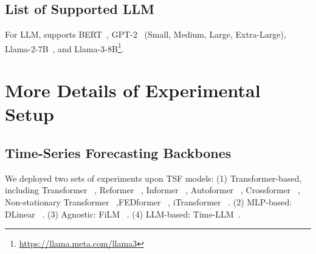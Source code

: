 \subsection{List of Supported LLM}
For LLM, \mmtsf supports BERT~\cite{devlin2018bert}, GPT-2~\cite{radford2019language} (Small, Medium, Large, Extra-Large), Llama-2-7B~\cite{touvron2023llama}, and Llama-3-8B\footnote{\url{https://llama.meta.com/llama3}}.

\section{More Details of Experimental Setup}\label{app:setup}
\subsection{Time-Series Forecasting Backbones}
We deployed two sets of experiments upon TSF models: (1) Transformer-based, including Transformer ~\cite{vaswani2017attention}, Reformer ~\cite{kitaev2020reformer}, Informer ~\cite{zhou2021informer}, Autoformer ~\cite{wu2021autoformer}, Crossformer ~\cite{zhang2022crossformer}, Non-stationary Transformer ~\cite{liu2022non},FEDformer ~\cite{zhou2022fedformer}, iTransformer ~\cite{liu2023itransformer}. (2) MLP-based: DLinear ~\cite{zeng2023transformers}. (3) Agnostic: FiLM ~\cite{zhou2022film}. (4) LLM-based: Time-LLM~\cite{jin2023time}.

